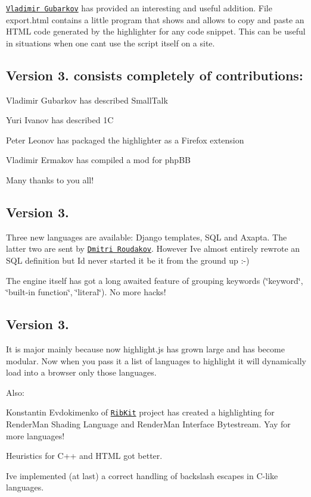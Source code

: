 \href{http://xonixx.blogspot.com/}{\tt Vladimir Gubarkov} has provided an interesting and useful addition. File export.\+html contains a little program that shows and allows to copy and paste an H\+T\+ML code generated by the highlighter for any code snippet. This can be useful in situations when one can\textquotesingle{}t use the script itself on a site.

\subsection*{Version 3. consists completely of contributions\+:}


\begin{DoxyItemize}
\item Vladimir Gubarkov has described Small\+Talk
\item Yuri Ivanov has described 1C
\item Peter Leonov has packaged the highlighter as a Firefox extension
\item Vladimir Ermakov has compiled a mod for php\+BB
\end{DoxyItemize}

Many thanks to you all!

\subsection*{Version 3.}

Three new languages are available\+: Django templates, S\+QL and Axapta. The latter two are sent by \href{http://roudakov.ru/}{\tt Dmitri Roudakov}. However I\textquotesingle{}ve almost entirely rewrote an S\+QL definition but I\textquotesingle{}d never started it be it from the ground up \+:-\/)

The engine itself has got a long awaited feature of grouping keywords (\char`\"{}keyword\char`\"{}, \char`\"{}built-\/in function\char`\"{}, \char`\"{}literal\char`\"{}). No more hacks!

\subsection*{Version 3.}

It is major mainly because now highlight.\+js has grown large and has become modular. Now when you pass it a list of languages to highlight it will dynamically load into a browser only those languages.

Also\+:


\begin{DoxyItemize}
\item Konstantin Evdokimenko of \href{http://ribkit.sourceforge.net/}{\tt Rib\+Kit} project has created a highlighting for Render\+Man Shading Language and Render\+Man Interface Bytestream. Yay for more languages!
\item Heuristics for C++ and H\+T\+ML got better.
\item I\textquotesingle{}ve implemented (at last) a correct handling of backslash escapes in C-\/like languages.
\end{DoxyItemize}

